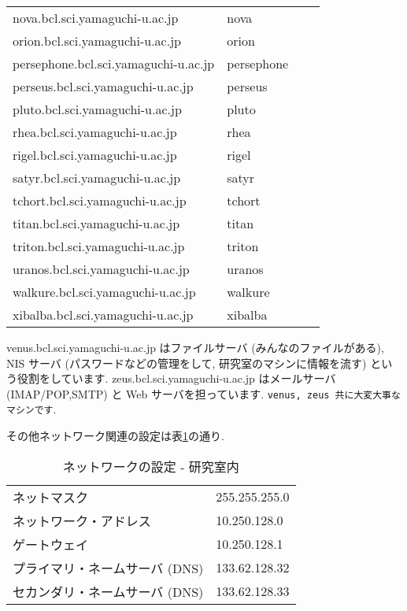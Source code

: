 \documentclass{jarticle}
\begin{document}
{\begin{table}[tbp]
\begin{tabular}[t]{llll}
nova.bcl.sci.yamaguchi-u.ac.jp &	nova & \\
orion.bcl.sci.yamaguchi-u.ac.jp &	orion & \\
persephone.bcl.sci.yamaguchi-u.ac.jp &	persephone & \\
perseus.bcl.sci.yamaguchi-u.ac.jp &	perseus & \\
pluto.bcl.sci.yamaguchi-u.ac.jp &	pluto & \\
rhea.bcl.sci.yamaguchi-u.ac.jp &	rhea & \\
rigel.bcl.sci.yamaguchi-u.ac.jp &	rigel & \\
satyr.bcl.sci.yamaguchi-u.ac.jp &	satyr & \\
tchort.bcl.sci.yamaguchi-u.ac.jp &	tchort & \\
titan.bcl.sci.yamaguchi-u.ac.jp &	titan & \\
triton.bcl.sci.yamaguchi-u.ac.jp &	triton & \\
uranos.bcl.sci.yamaguchi-u.ac.jp &	uranos & \\
walkure.bcl.sci.yamaguchi-u.ac.jp &	walkure & \\
xibalba.bcl.sci.yamaguchi-u.ac.jp &	xibalba & \\
\hline
\end{tabular}
\end{table}
}

venus.bcl.sci.yamaguchi-u.ac.jp はファイルサーバ (みんなのファイルがある),
NIS サーバ (パスワードなどの管理をして, 研究室のマシンに情報を流す)
という役割をしています.
zeus.bcl.sci.yamaguchi-u.ac.jp はメールサーバ (IMAP/POP,SMTP) と Web サーバを担っています.
\verb|venus, zeus 共に大変大事なマシンです|.

その他ネットワーク関連の設定は表\ref{tab:IPset_l}の通り.
\begin{table}[tbp]
\centering
\caption{ネットワークの設定 - 研究室内} \label{tab:IPset_l}
\begin{tabular}{ll}\hline
ネットマスク &		255.255.255.0 \\
ネットワーク・アドレス &	10.250.128.0 \\
ゲートウェイ &		10.250.128.1 \\
プライマリ・ネームサーバ (DNS) &	133.62.128.32 \\
セカンダリ・ネームサーバ (DNS) &	133.62.128.33 \\   \hline
\end{tabular}
\end{table}
\end{document}
